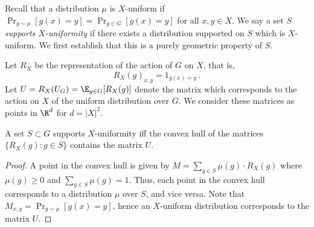 Recall that a distribution $\mu$ is $X$-uniform if $\Pr_{g \sim
\mu}[g(x)=y]=\Pr_{g \in G}[g(x)=y]$ for all $x,y \in X$. We say a set $S$
\emph{supports $X$-uniformity} if there exists a distribution supported on
$S$ which is $X$-uniform. We first establish that this is a purely geometric
property of $S$.

Let $R_X$ be the representation of the action of $G$ on $X$, that
is, \[
R_X(g)_{x,y}
= 1_{g(x)=y}\,.
\]
Let $U=R_X(U_G) = \E_{g \in G} [R_X(g)]$ denote the matrix
which corresponds to the action on $X$ of the uniform distribution over
$G$. We consider these matrices as points in $\R^{d}$ for $d=|X|^2$.

\begin{proposition}\label{prop:uniform-by-convex-hull}
A set $S \subset G$ supports $X$-uniformity iff the convex
hull of the matrices $\{R_X(g): g \in S\}$ contains the matrix $U$.
\end{proposition}
\begin{proof}
A point in the convex hull is given by $M = \sum_{g \in S} \mu(g) \cdot
R_X(g)$ where $\mu(g) \ge 0$ and $\sum_{g \in S} \mu(g)=1$. Thus, each
point in the convex hull corresponds to a distribution $\mu$ over $S$,
and vice versa. Note that $M_{x,y}=\Pr_{g \sim \mu}[g(x)=y]$, hence an
$X$-uniform distribution corresponds to the matrix $U$.
\end{proof}
